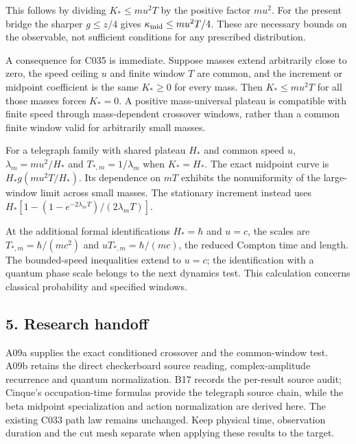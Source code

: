 \documentclass[11pt,a4paper]{article}
\begin{document}
This follows by dividing \(K_*\le mu^2T\) by the positive factor
\(mu^2\). For the present bridge the sharper \(g\le z/4\) gives
\(\kappa_{\rm mid}\le mu^2T/4\). These are necessary bounds on the
observable, not sufficient conditions for any prescribed distribution.

A consequence for C035 is immediate. Suppose masses extend arbitrarily
close to zero, the speed ceiling \(u\) and finite window \(T\) are
common, and the increment or midpoint coefficient is the same
\(K_*\ge0\) for every mass. Then \(K_*\le mu^2T\) for all those masses
forces \(K_*=0\). A positive mass-universal plateau is compatible with
finite speed through mass-dependent crossover windows, rather than a
common finite window valid for arbitrarily small masses.

For a telegraph family with shared plateau \(H_*\) and common speed
\(u\), \(\lambda_m=mu^2/H_*\) and \(T_{*,m}=1/\lambda_m\) when
\(K_*=H_*\). The exact midpoint curve is \(H_*g(mu^2T/H_*)\). Its
dependence on \(mT\) exhibits the nonuniformity of the large-window
limit across small masses. The stationary increment instead uses
\(H_*[1-(1-e^{-2\lambda_mT})/(2\lambda_mT)]\).

At the additional formal identifications \(H_*=\hbar\) and \(u=c\), the
scales are \(T_{*,m}=\hbar/(mc^2)\) and \(uT_{*,m}=\hbar/(mc)\), the
reduced Compton time and length. The bounded-speed inequalities extend
to \(u=c\); the identification with a quantum phase scale belongs to the
next dynamics test. This calculation concerns classical probability and
specified windows.

\hypertarget{research-handoff}{%
\subsection{5. Research handoff}\label{research-handoff}}

A09a supplies the exact conditioned crossover and the common-window
test. A09b retains the direct checkerboard source reading,
complex-amplitude recurrence and quantum normalization. B17 records the
per-result source audit; Cinque's occupation-time formulas provide the
telegraph source chain, while the beta midpoint specialization and
action normalization are derived here. The existing C033 path law
remains unchanged. Keep physical time, observation duration and the cut
mesh separate when applying these results to the target.
\end{document}
